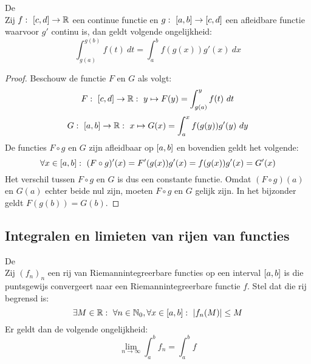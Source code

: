 \documentclass[main.tex]{subfiles}
\begin{document}
\begin{bpr}
  De \\
  Zij $f:\ \interval{c}{d}\rightarrow\mathbb{R}$ een continue functie en $g:\ \interval{a}{b} \rightarrow \interval{c}{d}$ een afleidbare functie waarvoor $g'$ continu is, dan geldt volgende ongelijkheid:
  \[ \int_{g(a)}^{g(b)}f(t)\ dt = \int_{a}^{b}f(g(x))g'(x)\ dx \]

  \begin{proof}
    Beschouw de functie $F$ en $G$ als volgt:
    \[ F:\ \interval{c}{d} \rightarrow \mathbb{R}:\ y \mapsto F(y) = \int_{g(a)}^{y}f(t)\ dt \]
    \[ G:\ \interval{a}{b} \rightarrow \mathbb{R}:\ x \mapsto G(x) = \int_{a}^{x}f(g(y))g'(y)\ dy \]
    De functies $F \circ g$ en $G$ zijn afleidbaar op $\interval{a}{b}$ en bovendien geldt het volgende:
    \[ \forall x\in\interval{a}{b}:\ (F \circ g)'(x) = F'(g(x))g'(x) = f(g(x))g'(x) = G'(x) \]
    Het verschil tussen $F\circ g$ en $G$ is dus een constante functie.
    Omdat $(F \circ g)(a)$ en $G(a)$ echter beide nul zijn, moeten $F\circ g$ en $G$ gelijk zijn.
    In het bijzonder geldt $F(g(b)) = G(b)$.
  \end{proof}
\end{bpr}


\subsection{Integralen en limieten van rijen van functies}
\label{sec:integr-en-limi}

\begin{bst}
  De \\
  Zij $(f_{n})_{n}$ een rij van Riemannintegreerbare functies op een interval $\interval{a}{b}$ is die puntsgewijs convergeert naar een Riemannintegreerbare functie $f$.
  Stel dat die rij begrensd is:
  \[ \exists M\in \mathbb{R}:\ \forall n\in \mathbb{N}_{0}, \forall x \in \interval{a}{b}:\ \left|f_{n}(M)\right| \le M \]
  Er geldt dan de volgende ongelijkheid:
  \[ \lim_{n\rightarrow \infty}\int_{a}^{b}f_{n} = \int_{a}^{b}f \]
\zb
\end{bst}

\end{document}
